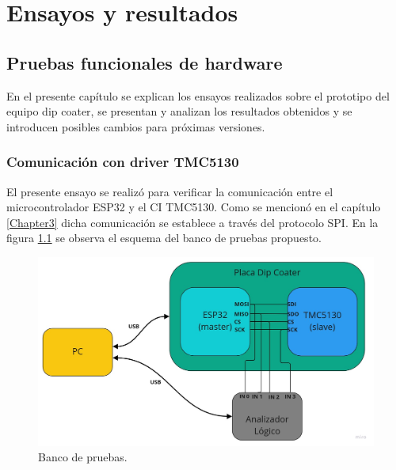 
\chapter{Ensayos y resultados} %

\label{Chapter4} %


\section{Pruebas funcionales de hardware}

En el presente capítulo se explican los ensayos realizados sobre el prototipo del equipo dip coater, se presentan y analizan los resultados obtenidos y se introducen posibles cambios para próximas versiones.
\subsection{Comunicación con driver TMC5130}

El presente ensayo se realizó para verificar la comunicación entre el microcontrolador ESP32 y el CI TMC5130. Como se mencionó en el capítulo \ref{Chapter3} dicha comunicación se establece a través del  protocolo SPI. En la figura \ref{fig:ensayo_spi_0} se observa el esquema del banco de pruebas propuesto.

\begin{figure}[h]
\centering 
\includegraphics[width=1\textwidth]{./Figures/ensayo_spi.jpg}
\caption{Banco de pruebas.}
\label{fig:ensayo_spi_0}
\end{figure}


